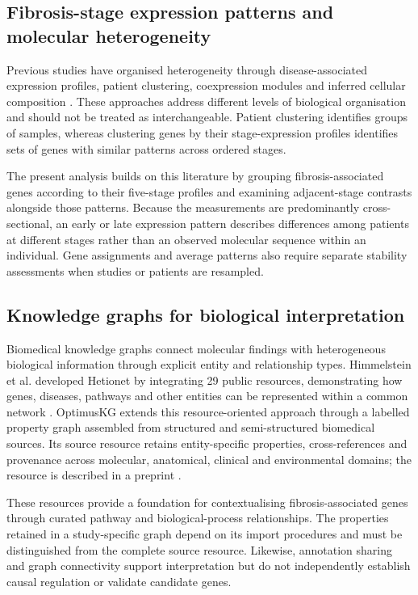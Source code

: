 \documentclass[11pt,a4paper]{article}
\begin{document}
\subsection*{Fibrosis-stage expression patterns and molecular heterogeneity}
Previous studies have organised heterogeneity through disease-associated expression profiles, patient clustering, coexpression modules and inferred cellular composition \cite{ref4,govaere2020,piras2024,maiers2026}. These approaches address different levels of biological organisation and should not be treated as interchangeable. Patient clustering identifies groups of samples, whereas clustering genes by their stage-expression profiles identifies sets of genes with similar patterns across ordered stages.

The present analysis builds on this literature by grouping fibrosis-associated genes according to their five-stage profiles and examining adjacent-stage contrasts alongside those patterns. Because the measurements are predominantly cross-sectional, an early or late expression pattern describes differences among patients at different stages rather than an observed molecular sequence within an individual. Gene assignments and average patterns also require separate stability assessments when studies or patients are resampled.

\subsection*{Knowledge graphs for biological interpretation}
Biomedical knowledge graphs connect molecular findings with heterogeneous biological information through explicit entity and relationship types. Himmelstein et al. developed Hetionet by integrating 29 public resources, demonstrating how genes, diseases, pathways and other entities can be represented within a common network \cite{himmelstein2017}. OptimusKG extends this resource-oriented approach through a labelled property graph assembled from structured and semi-structured biomedical sources. Its source resource retains entity-specific properties, cross-references and provenance across molecular, anatomical, clinical and environmental domains; the resource is described in a preprint \cite{ref5}.

These resources provide a foundation for contextualising fibrosis-associated genes through curated pathway and biological-process relationships. The properties retained in a study-specific graph depend on its import procedures and must be distinguished from the complete source resource. Likewise, annotation sharing and graph connectivity support interpretation but do not independently establish causal regulation or validate candidate genes.
\end{document}
